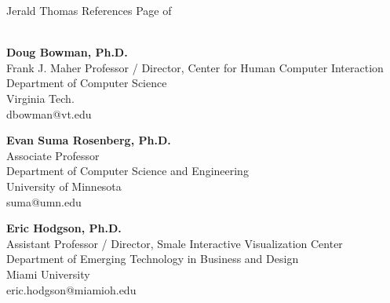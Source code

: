 \newpage

\setcounter{page}{1}
\makecvfooter
  {Jerald Thomas}
  {References}
  {Page \thepage \hspace{1pt} of \pageref{references_last}}

\makecvheader[C]
\singlespacing

\\

\textbf{Doug Bowman, Ph.D.}\\
\hspace*{0.25cm} Frank J. Maher Professor / Director, Center for Human Computer Interaction\\
\hspace*{0.25cm} Department of Computer Science\\
\hspace*{0.25cm} Virginia Tech.\\
\hspace*{0.25cm} dbowman@vt.edu

\textbf{Evan Suma Rosenberg, Ph.D.}\\
\hspace*{0.25cm} Associate Professor\\
\hspace*{0.25cm} Department of Computer Science and Engineering\\
\hspace*{0.25cm} University of Minnesota\\
\hspace*{0.25cm} suma@umn.edu

\textbf{Eric Hodgson, Ph.D.}\\
\hspace*{0.25cm} Assistant Professor / Director, Smale Interactive Visualization Center\\
\hspace*{0.25cm} Department of Emerging Technology in Business and Design\\
\hspace*{0.25cm} Miami University\\
\hspace*{0.25cm} eric.hodgson@miamioh.edu


